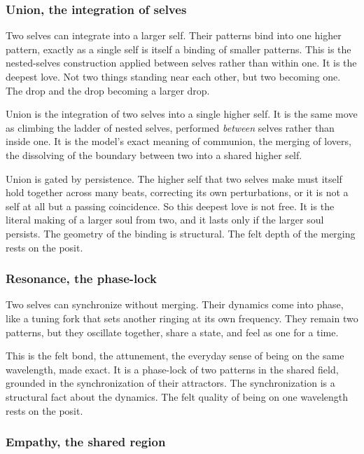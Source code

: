 \subsubsection{Union, the integration of selves}

Two selves can integrate into a larger self. Their patterns bind into one higher pattern, exactly as a single self is itself a binding of smaller patterns. This is the nested-selves construction applied between selves rather than within one. It is the deepest love. Not two things standing near each other, but two becoming one. The drop and the drop becoming a larger drop.

\begin{result}
Union is the integration of two selves into a single higher self. It is the same move as climbing the ladder of nested selves, performed \emph{between} selves rather than inside one. It is the model's exact meaning of communion, the merging of lovers, the dissolving of the boundary between two into a shared higher self.
\end{result}

Union is gated by persistence. The higher self that two selves make must itself hold together across many beats, correcting its own perturbations, or it is not a self at all but a passing coincidence. So this deepest love is not free. It is the literal making of a larger soul from two, and it lasts only if the larger soul persists. The geometry of the binding is structural. The felt depth of the merging rests on the posit.

\subsubsection{Resonance, the phase-lock}

Two selves can synchronize without merging. Their dynamics come into phase, like a tuning fork that sets another ringing at its own frequency. They remain two patterns, but they oscillate together, share a state, and feel as one for a time.

This is the felt bond, the attunement, the everyday sense of being on the same wavelength, made exact. It is a phase-lock of two patterns in the shared field, grounded in the synchronization of their attractors. The synchronization is a structural fact about the dynamics. The felt quality of being on one wavelength rests on the posit.

\subsubsection{Empathy, the shared region}

